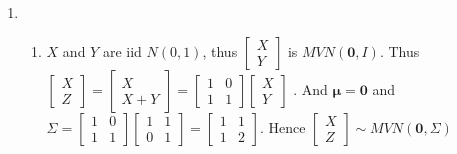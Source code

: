 \documentclass{article}
\begin{document}
\begin{enumerate}[leftmargin = 0 em, label = \arabic*., font = \bfseries]
 	\item 
 	\begin{enumerate}
 		\item 
 		$X$ and $Y$ are iid $N(0,1)$, thus $\begin{bmatrix}
 			X\\
 			Y
 		\end{bmatrix}$
 		is $MVN(\bm 0, I)$. Thus $\begin{bmatrix}
 			X\\
 			Z
 		\end{bmatrix}
 		=\begin{bmatrix}
 			X\\
 			X+Y
 		\end{bmatrix}
 		= \begin{bmatrix}
 			1&0\\
 			1&1
 		\end{bmatrix}
 		\begin{bmatrix}
 			X\\
 			Y
 		\end{bmatrix} $ . And $\bm \mu = \bm 0$ and $\Sigma  = \begin{bmatrix}
 			1&0\\
 			1&1
 		\end{bmatrix} 
 		\begin{bmatrix}
 			1&1\\
 			0&1
 		\end{bmatrix}=
 		\begin{bmatrix}
 			1&1\\
 			1&2
 		\end{bmatrix}$. Hence $\begin{bmatrix}
 			X\\
 			Z
 		\end{bmatrix} \sim MVN(\bm 0, \Sigma)$ 


\end{enumerate}
\end{enumerate}
\end{document}
